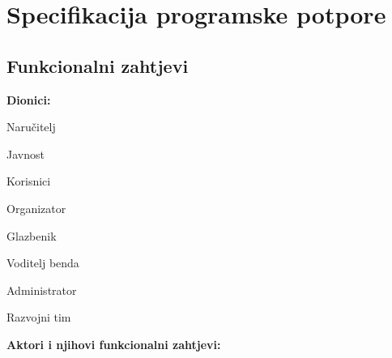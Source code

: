 \chapter{Specifikacija programske potpore}
		
	\section{Funkcionalni zahtjevi}
		\noindent \textbf{Dionici:}
		
    		\begin{packed_enum}
    			\item Naručitelj
    			\item Javnost
    			\item Korisnici
    			\item Organizator
    			\item Glazbenik 	
    			\item Voditelj benda						
    			\item Administrator
    			\item Razvojni tim
    		\end{packed_enum}
		
		\noindent \textbf{Aktori i njihovi funkcionalni zahtjevi:}
		
